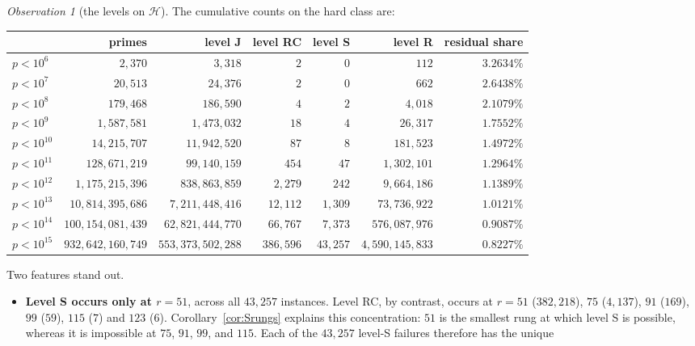 \documentclass[11pt]{article}
\theoremstyle{definition}
\theoremstyle{remark}
\newtheorem{observation}[theorem]{Observation}
\begin{document}
\begin{observation}[the levels on $\mathcal{H}$]\label{obs:hard13}
The cumulative counts on the hard class are:
\begin{center}
\small
\begin{tabular}{lrrrrrr}
\toprule
& primes & level J & level RC & level S & level R & residual share \\
\midrule
$p < 10^6$    & $2{,}370$          & $3{,}318$         & $2$      & $0$     & $112$          & $3.2634\%$ \\
$p < 10^7$    & $20{,}513$         & $24{,}376$        & $2$      & $0$     & $662$          & $2.6438\%$ \\
$p < 10^8$    & $179{,}468$        & $186{,}590$       & $4$      & $2$     & $4{,}018$      & $2.1079\%$ \\
$p < 10^9$    & $1{,}587{,}581$    & $1{,}473{,}032$   & $18$     & $4$     & $26{,}317$     & $1.7552\%$ \\
$p < 10^{10}$ & $14{,}215{,}707$   & $11{,}942{,}520$  & $87$     & $8$     & $181{,}523$    & $1.4972\%$ \\
$p < 10^{11}$ & $128{,}671{,}219$  & $99{,}140{,}159$  & $454$    & $47$    & $1{,}302{,}101$& $1.2964\%$ \\
$p < 10^{12}$ & $1{,}175{,}215{,}396$ & $838{,}863{,}859$ & $2{,}279$ & $242$ & $9{,}664{,}186$ & $1.1389\%$ \\
$p < 10^{13}$ & $10{,}814{,}395{,}686$ & $7{,}211{,}448{,}416$ & $12{,}112$ & $1{,}309$ & $73{,}736{,}922$ & $1.0121\%$ \\
$p < 10^{14}$ & $100{,}154{,}081{,}439$ & $62{,}821{,}444{,}770$ & $66{,}767$ & $7{,}373$ & $576{,}087{,}976$ & $0.9087\%$ \\
$p < 10^{15}$ & $932{,}642{,}160{,}749$ & $553{,}373{,}502{,}288$ & $386{,}596$ & $43{,}257$ & $4{,}590{,}145{,}833$ & $0.8227\%$ \\
\bottomrule
\end{tabular}
\end{center}
Two features stand out.
\begin{itemize}
\item \textbf{Level S occurs only at $r = 51$}, across all $43{,}257$ instances.
Level RC, by contrast, occurs at
$r = 51$ ($382{,}218$), $75$ ($4{,}137$), $91$ ($169$), $99$ ($59$), $115$ ($7$) and
$123$ ($6$). Corollary~\ref{cor:Srungs} explains this concentration: $51$ is the
smallest rung at which level S is possible, whereas it is impossible at $75$, $91$,
$99$, and $115$. Each of the $43{,}257$ level-S failures therefore has the unique

\end{itemize}
\end{observation}
\end{document}
